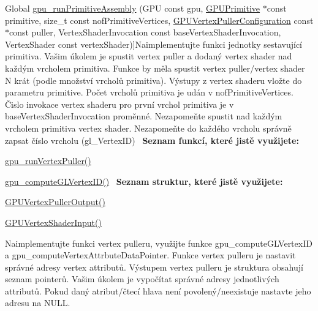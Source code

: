 \begin{DoxyRefList}
\hypertarget{todo__todo000006}{}%
Global \hyperlink{group__gpu__side_ga5eb10381738a5e0426b2811820bc9483}{gpu\+\_\+run\+Primitive\+Assembly} (G\+PU const gpu, \hyperlink{structGPUPrimitive}{G\+P\+U\+Primitive} $\ast$const primitive, size\+\_\+t const nof\+Primitive\+Vertices, \hyperlink{structGPUVertexPullerConfiguration}{G\+P\+U\+Vertex\+Puller\+Configuration} const $\ast$const puller, Vertex\+Shader\+Invocation const base\+Vertex\+Shader\+Invocation, Vertex\+Shader const vertex\+Shader)]Naimplementujte funkci jednotky sestavující primitiva. Vašim úkolem je spustit vertex puller a dodaný vertex shader nad každým vrcholem primitiva. Funkce by měla spustit vertex puller/vertex shader N krát (podle množství vrcholů primitiva). Výstupy z vertex shaderu vložte do parametru primitive. Počet vrcholů primitiva je udán v nof\+Primitive\+Vertices. Čislo invokace vertex shaderu pro první vrchol primitiva je v base\+Vertex\+Shader\+Invocation proměnné. Nezapomeňte spustit nad každým vrcholem primitiva vertex shader. Nezapomeňte do každého vrcholu správně zapsat číslo vrcholu (gl\+\_\+\+Vertex\+ID)~\newline
 {\bfseries Seznam funkcí, které jistě využijete\+:}
\begin{DoxyItemize}
\item \hyperlink{group__gpu__side_ga0e0c36548db12eea1e6d512b9f855a1c}{gpu\+\_\+run\+Vertex\+Puller()}
\item \hyperlink{group__gpu__side_ga3983ddd2c559c1a6d1e1f1f37be3eae0}{gpu\+\_\+compute\+G\+L\+Vertex\+I\+D()}~\newline
 {\bfseries Seznam struktur, které jistě využijete\+:}
\item \hyperlink{fwd_8h_a791f232eebdb273092201dacd9b3fd60}{G\+P\+U\+Vertex\+Puller\+Output()}
\item \hyperlink{fwd_8h_ac6b1d5e207ea5e4a8fc1208c7da10ffa}{G\+P\+U\+Vertex\+Shader\+Input()}  
\end{DoxyItemize}
\item[\label{todo__todo000005}%
\hypertarget{todo__todo000005}{}%
Global \hyperlink{group__gpu__side_ga0e0c36548db12eea1e6d512b9f855a1c}{gpu\+\_\+run\+Vertex\+Puller} (\hyperlink{structGPUVertexPullerOutput}{G\+P\+U\+Vertex\+Puller\+Output} $\ast$const output, \hyperlink{structGPUVertexPullerConfiguration}{G\+P\+U\+Vertex\+Puller\+Configuration} const $\ast$const puller, Vertex\+Shader\+Invocation const vertex\+Shader\+Invocation)]Naimplementujte funkci vertex pulleru, využijte funkce gpu\+\_\+compute\+G\+L\+Vertex\+ID a gpu\+\_\+compute\+Vertex\+Attrbute\+Data\+Pointer. Funkce vertex pulleru je nastavit správné adresy vertex attributů. Výstupem vertex pulleru je struktura obsahují seznam pointerů. Vašim úkolem je vypočítat správné adresy jednotlivých attributů. Pokud daný atribut/čtecí hlava není povolený/neexistuje nastavte jeho adresu na N\+U\+LL.~\newline

\end{DoxyRefList}
